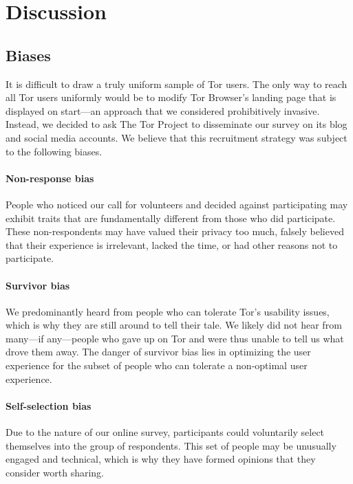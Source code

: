 \section{Discussion}
\label{sec:discussion}

\subsection{Biases}

It is difficult to draw a truly uniform sample of Tor users.  The only way to
reach all Tor users uniformly would be to modify Tor Browser's landing page
that is displayed on start---an approach that we considered prohibitively
invasive.  Instead, we decided to ask The Tor Project to disseminate our survey
on its blog and social media accounts.  We believe that this recruitment
strategy was subject to the following biases.

\paragraph{Non-response bias} 
People who noticed our call for volunteers and decided against participating
may exhibit traits that are fundamentally different from those who did
participate.  These non-respondents may have valued their privacy too much,
falsely believed that their experience is irrelevant, lacked the time, or had
other reasons not to participate.

\paragraph{Survivor bias}
We predominantly heard from people who can tolerate Tor's usability issues,
which is why they are still around to tell their tale.  We likely did not hear
from many---if any---people who gave up on Tor and were thus unable to tell us
what drove them away.  The danger of survivor bias lies in optimizing the user
experience for the subset of people who can tolerate a non-optimal user
experience.

\paragraph{Self-selection bias}
Due to the nature of our online survey, participants could voluntarily select
themselves into the group of respondents.  This set of people may be unusually
engaged and technical, which is why they have formed opinions that they
consider worth sharing.

